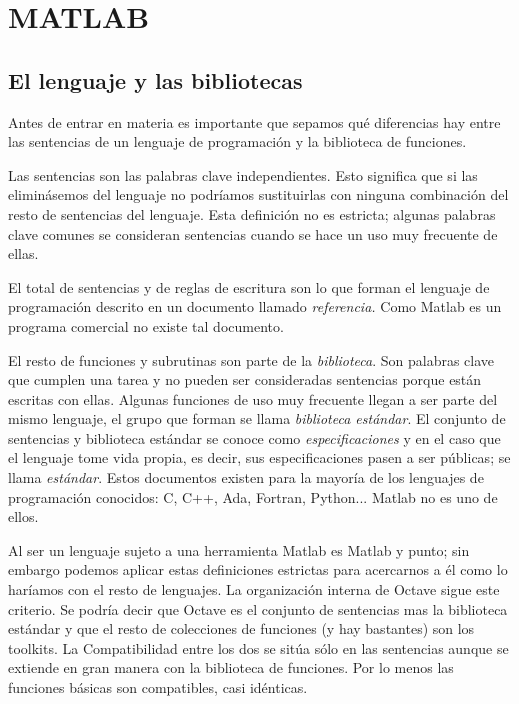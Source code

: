 \chapter{MATLAB}



\section{El lenguaje y las bibliotecas}

Antes de entrar en materia es importante que sepamos qué diferencias
hay entre las sentencias de un lenguaje de programación y la
biblioteca de funciones.

Las sentencias son las palabras clave independientes. Esto significa
que si las eliminásemos del lenguaje no podríamos sustituirlas con
ninguna combinación del resto de sentencias del lenguaje. Esta
definición no es estricta; algunas palabras clave comunes se
consideran sentencias cuando se hace un uso muy frecuente de ellas.

El total de sentencias y de reglas de escritura son lo que forman el
lenguaje de programación descrito en un documento llamado
\emph{referencia.}  Como Matlab es un programa
comercial no existe tal documento.

El resto de funciones y subrutinas son parte de la
\emph{biblioteca}.  Son palabras clave que cumplen
una tarea y no pueden ser consideradas sentencias porque están
escritas con ellas. Algunas funciones de uso muy frecuente llegan a
ser parte del mismo lenguaje, el grupo que forman se llama
\emph{biblioteca estándar}.  El conjunto de
sentencias y biblioteca estándar se conoce como
\emph{especificaciones} y en el caso que el lenguaje tome vida propia,
es decir, sus especificaciones pasen a ser públicas; se llama
\emph{estándar}. Estos documentos existen para la mayoría de los
lenguajes de programación conocidos: C, C++, Ada, Fortran, Python...
Matlab no es uno de ellos.

Al ser un lenguaje sujeto a una herramienta Matlab es Matlab y punto;
sin embargo podemos aplicar estas definiciones estrictas para
acercarnos a él como lo haríamos con el resto de lenguajes. La
organización interna de Octave sigue este criterio. Se podría decir
que Octave es el conjunto de sentencias mas la biblioteca estándar y
que el resto de colecciones de funciones (y hay bastantes) son los
toolkits. La Compatibilidad entre los dos se sitúa sólo en las
sentencias aunque se extiende en gran manera con la biblioteca de
funciones. Por lo menos las funciones básicas son compatibles, casi
idénticas.

